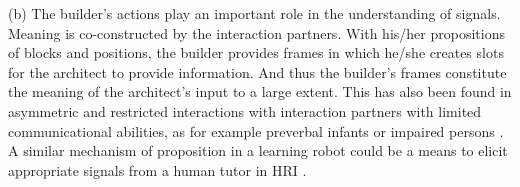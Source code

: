 (b) The builder's actions play an important role in the understanding of signals. Meaning is co-constructed by the interaction partners. With his/her propositions of blocks and positions, the builder provides frames in which he/she creates slots for the architect to provide information. And thus the builder's frames constitute the meaning of the architect's input to a large extent. This has also been found in asymmetric and restricted interactions with interaction partners with limited communicational abilities, as for example preverbal infants or impaired persons \cite{ochs1979propositions, goodwin1995co}. A similar mechanism of proposition in a learning robot could be a means to elicit appropriate signals from a human tutor in HRI \cite{cakmak2012designing,vollmer2014robots,cangelosi2010integration}. 
